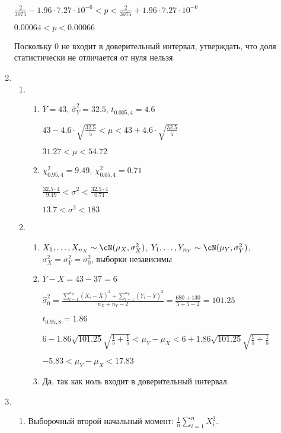 \begin{enumerate}
$\frac{2}{3075} - 1.96 \cdot 7.27 \cdot 10^{-6} < p < \frac{2}{3075} + 1.96 \cdot 7.27 \cdot 10^{-6}$

$0.00064 < p < 0.00066$

Поскольку $0$ не входит в доверительный интервал, утверждать, что доля статистически
не отличается от нуля нельзя.

\item
\begin{enumerate}
  \item
  \begin{enumerate}
    \item $\overline{Y} = 43$, $\hat{\sigma}_Y^2 = 32.5$, $t_{0.005, 4} = 4.6$

    $43 - 4.6 \cdot \sqrt{\frac{32.5}{5}} < \mu < 43 + 4.6 \cdot \sqrt{\frac{32.5}{5}}$

    $31.27 < \mu < 54.72$

    \item $\chi^2_{0.95, 4} = 9.49$, $\chi^2_{0.05, 4} = 0.71$

    $\frac{32.5 \cdot 4}{9.49} < \sigma^2 < \frac{32.5 \cdot 4}{0.71}$

    $13.7 < \sigma^2 < 183$
  \end{enumerate}
  \item
  \begin{enumerate}
  \item
  $X_1, \ldots, X_{n_X} \sim \cN(\mu_X, \sigma^2_X)$, $Y_1, \ldots, Y_{n_Y} \sim \cN(\mu_Y, \sigma^2_Y)$,
  $\sigma^2_X = \sigma^2_Y = \sigma^2_0$, выборки независимы

  \item $\overline{Y} - \overline{X} = 43 - 37 = 6$

  $\hat{\sigma}^2_0 = \frac{\sum_{i=1}^{n_X} (X_i - \overline X)^2 + \sum_{i=1}^{n_Y} (Y_i - \overline Y)^2}{n_X + n_Y - 2} = \frac{680+130}{5+5-2} = 101.25$

  $t_{0.95, 8} = 1.86$

  $6 - 1.86 \sqrt{101.25} \sqrt{\frac{1}{5} + \frac{1}{5}} < \mu_Y - \mu_X <  6 + 1.86 \sqrt{101.25} \sqrt{\frac{1}{5} + \frac{1}{5}} $

  $-5.83 < \mu_Y - \mu_X < 17.83$
  \item Да, так как ноль входит в доверительный интервал.
  \end{enumerate}
\end{enumerate}
\item
\begin{enumerate}
  \item Выборочный второй начальный момент: $\frac{1}{n} \sum_{i=1}^n X_i^2$.


\end{enumerate}
\end{enumerate}
